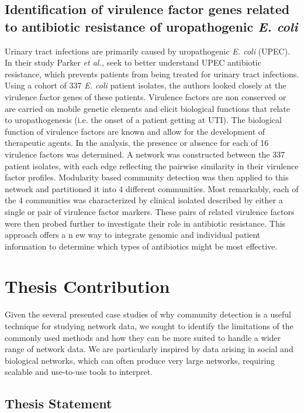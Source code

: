 \subsection{Identification of virulence factor genes related to antibiotic resistance of uropathogenic \emph{E. coli}}
\indent Urinary tract infections are primarily caused by uropathogenic \emph{E. coli} (UPEC). In their study Parker \emph{et al.,} seek to better understand UPEC antibiotic resistance, which prevents patients from being treated for urinary tract infections. Using a cohort of 337 \emph{E. coli} patient isolates, the authors looked closely at the virulence factor genes of these patients. Virulence factors are non conserved or are carried on mobile genetic elements and elicit biological functions that relate to uropathogenesis (i.e. the onset of a patient getting at UTI). The biological function of virulence factors are known and allow for the development of therapeutic agents. In the analysis, the presence or absence for each of 16 virulence factors was determined. A network was constructed between the 337 patient isolates, with each edge reflecting the pairwise similarity in their virulence factor profiles. Modularity based community detection was then applied to this network and partitioned it into 4 different communities. Most remarkably, each of the 4 communities was characterized by clinical isolated described by either a single or pair of virulence factor markers. These pairs of related virulence factors were then probed further to investigate their role in antibiotic resistance. This approach offers a n ew way to integrate genomic and individual patient information to determine which types of antibiotics might be most effective.  

\section{Thesis Contribution}
\indent Given the several presented case studies of why community detection is a useful technique for studying network data, we sought to  identify the limitations of the commonly used methods and how they can be more suited to handle a wider range of network data. We are particularly inspired by data arising in social and biological networks, which can often produce very large networks, requiring scalable and use-to-use tools to interpret. 
\subsection{Thesis Statement}

